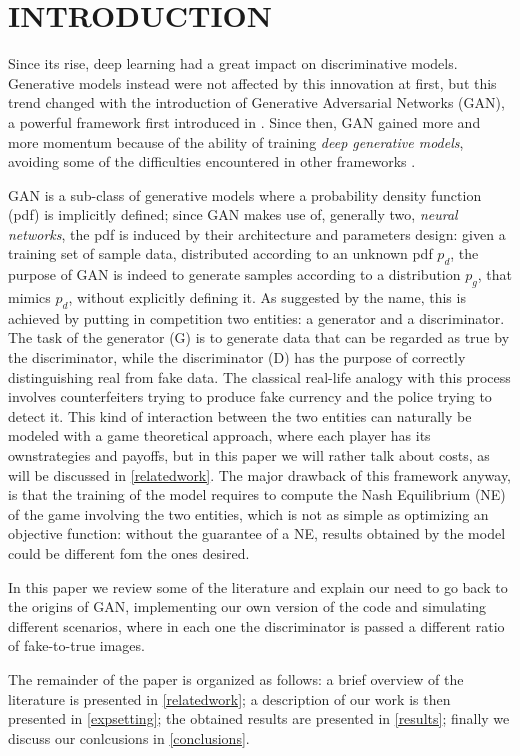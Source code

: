 \section{INTRODUCTION} \label{intro}

Since its rise, deep learning had a great impact on discriminative models. Generative models instead were not affected by this innovation at first, but this trend changed with the introduction of Generative Adversarial Networks (GAN), a powerful framework first introduced in \cite{bibid}. Since then, GAN gained more and more momentum because of the ability of training \textit{deep generative models}, avoiding some of the difficulties encountered in other frameworks \cite{bibid}.

GAN is a sub-class of generative models where a probability density function (pdf) is implicitly defined; since GAN makes use of, generally two, \textit{neural networks}, the pdf is induced by their architecture and parameters design: given a training set of sample data, distributed according to an unknown pdf $p_d$, the purpose of GAN is indeed to generate samples according to a distribution $p_g$, that mimics $p_d$, without explicitly defining it.
As suggested by the name, this is achieved by putting in competition two entities: a generator and a discriminator. The task of the generator (G) is to generate data that can be regarded as true by the discriminator, while the discriminator (D) has the purpose of correctly distinguishing real from fake data. The classical real-life analogy with this process involves counterfeiters trying to produce fake currency and the police trying to detect it.
This kind of interaction between the two entities can naturally be modeled with a game theoretical approach, where each player has its ownstrategies and payoffs, but in this paper we will rather talk about costs, as will be discussed in \ref{relatedwork}. The major drawback of this framework anyway, is that the training of the model requires to compute the Nash Equilibrium (NE) of the game involving the two entities, which is not as simple as optimizing an objective function: without the guarantee of a NE, results obtained by the model could be different fom the ones desired.

In this paper we review some of the literature and explain our need to go back to the origins of GAN, implementing our own version of the code and simulating different scenarios, where in each one the discriminator is passed a different ratio of fake-to-true images.

The remainder of the paper is organized as follows: a brief overview of the literature is presented in \ref{relatedwork}; a description of our work is then presented in \ref{expsetting}; the obtained results are presented in \ref{results}; finally we discuss our conlcusions in \ref{conclusions}.
